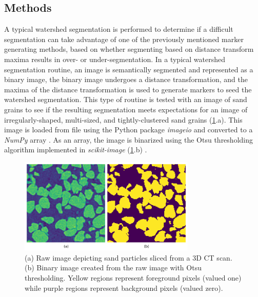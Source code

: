 \subsection{Methods}
A typical watershed segmentation is performed to determine if a difficult
segmentation can take advantage of one of the previously mentioned
marker generating methods, based on whether segmenting based on distance
transform maxima results in over- or under-segmentation.
In a typical watershed
segmentation routine, an image is semantically segmented and represented
as a binary image, the binary
image undergoes a distance transformation, and the maxima of the distance
transformation is used to generate markers to seed the watershed
segmentation. This type of routine is tested with an image of sand grains
to see if the resulting segmentation meets expectations for an image of
irregularly-shaped, multi-sized, and tightly-clustered sand grains
(\ref{fig/05/raw-bw}.a). This image is loaded from file using the
Python package \textit{imageio} and converted to a \textit{NumPy}
array \cite{imageio,numpy}. As an array, the image is
binarized using the Otsu thresholding algorithm
implemented in \textit{scikit-image} (\ref{fig/05/raw-bw}.b)
\cite{Otsu1979,skimage}.

\begin{figure}[ht]
    \centering
    \includegraphics[width=0.75\textwidth]{figures/05/01-raw-bw.png}
    \caption{
        \small{}
        (a) Raw image depicting sand particles sliced from a 3D CT scan.
        (b) Binary image created from the raw image with Otsu thresholding.
        Yellow regions represent foreground pixels (valued one) while purple
        regions represent background pixels (valued zero).
    }
    \label{fig/05/raw-bw}
\end{figure}


